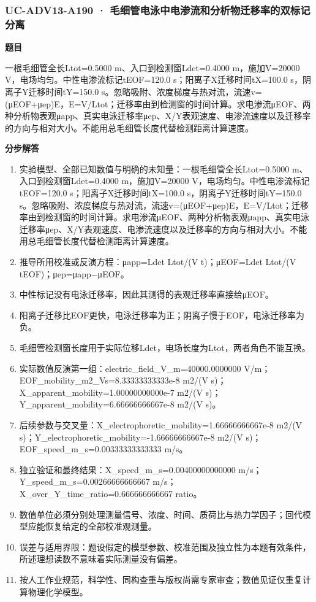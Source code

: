 \documentclass[UTF8,11pt,a4paper]{ctexart}
\begin{document}
\subsubsection*{UC-ADV13-A190 · 毛细管电泳中电渗流和分析物迁移率的双标记分离}
\noindent\textbf{题目}\par
一根毛细管全长Ltot=0.5000 m、入口到检测窗Ldet=0.4000 m，施加V=20000 V，电场均匀。中性电渗流标记tEOF=120.0 s；阳离子X迁移时间tX=100.0 s，阴离子Y迁移时间tY=150.0 s。忽略吸附、浓度梯度与热对流，流速v=(μEOF+μep)E，E=V/Ltot；迁移率由到检测窗的时间计算。求电渗流μEOF、两种分析物表观μapp、真实电泳迁移率μep、X/Y表观速度、电渗流速度以及迁移率的方向与相对大小。不能用总毛细管长度代替检测距离计算速度。\par
\medskip\noindent\textbf{分步解答}
\begin{enumerate}
\item 实验模型、全部已知数值与明确的未知量：一根毛细管全长Ltot=0.5000 m、入口到检测窗Ldet=0.4000 m，施加V=20000 V，电场均匀。中性电渗流标记tEOF=120.0 s；阳离子X迁移时间tX=100.0 s，阴离子Y迁移时间tY=150.0 s。忽略吸附、浓度梯度与热对流，流速v=(μEOF+μep)E，E=V/Ltot；迁移率由到检测窗的时间计算。求电渗流μEOF、两种分析物表观μapp、真实电泳迁移率μep、X/Y表观速度、电渗流速度以及迁移率的方向与相对大小。不能用总毛细管长度代替检测距离计算速度。
\item 推导所用校准或反演方程：μapp=Ldet Ltot/(V t)；μEOF=Ldet Ltot/(V tEOF)；μep=μapp−μEOF。
\item 中性标记没有电泳迁移率，因此其测得的表观迁移率直接给μEOF。
\item 阳离子迁移比EOF更快，电泳迁移率为正；阴离子慢于EOF，电泳迁移率为负。
\item 毛细管检测窗长度用于实际位移Ldet，电场长度为Ltot，两者角色不能互换。
\item 实际数值反演第一组：electric\_field\_V\_m=40000.0000000 V/m；EOF\_mobility\_m2\_Vs=8.33333333333e-8 m2/(V s)；X\_apparent\_mobility=1.00000000000e-7 m2/(V s)；Y\_apparent\_mobility=6.66666666667e-8 m2/(V s)。
\item 后续参数与交叉量：X\_electrophoretic\_mobility=1.66666666667e-8 m2/(V s)；Y\_electrophoretic\_mobility=-1.66666666667e-8 m2/(V s)；EOF\_speed\_m\_s=0.00333333333333 m/s。
\item 独立验证和最终结果：X\_speed\_m\_s=0.00400000000000 m/s；Y\_speed\_m\_s=0.00266666666667 m/s；X\_over\_Y\_time\_ratio=0.666666666667 ratio。
\item 数值单位必须分别处理测量信号、浓度、时间、质荷比与热力学因子；回代模型应能恢复给定的全部校准观测量。
\item 误差与适用界限：题设假定的模型参数、校准范围及独立性为本题有效条件，所述理想读数不意味着实际测量没有偏差。
\item 按人工作业规范，科学性、同构查重与版权尚需专家审查；数值见证仅重复计算物理化学模型。
\end{enumerate}
\end{document}
